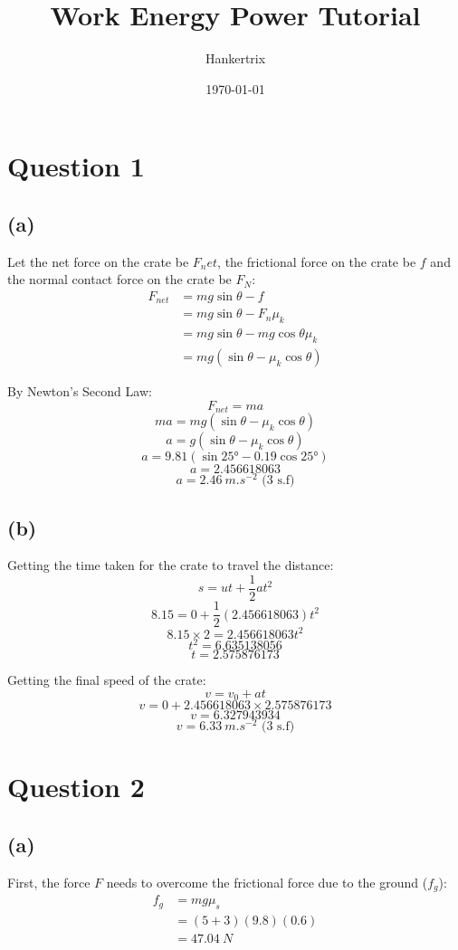 \documentclass[11pt]{article}
\author{Hankertrix}
\date{\today}
\title{Work Energy Power Tutorial}
\begin{document}
\maketitle
\setcounter{tocdepth}{2}
\tableofcontents


\section{Question 1}
\label{sec:org8bf0041}

\subsection{(a)}
\label{sec:orgd1a7f95}
Let the net force on the crate be \(F_net\), the frictional force on the crate be \(f\) and the normal contact force on the crate be \(F_N\):
\begin{align*}
F_{net} &= mg \sin \theta - f \\
&= mg \sin \theta - F_n \mu_k \\
&= mg \sin \theta - mg \cos \theta \mu_k \\
&= mg (\sin \theta - \mu_k \cos \theta)
\end{align*}

By Newton's Second Law:
\[F_{net} = ma\]
\[ma = mg (\sin \theta -\mu_k \cos \theta)\]
\[a = g (\sin \theta - \mu_k \cos \theta)\]
\[a = 9.81 (\sin 25 \unit{\degree} - 0.19 \cos 25 \unit{\degree})\]
\[a = 2.456618063\]
\[a = \SI{2.46}{\unit{m.s^{-2}}} \text{ (3 s.f)}\]

\subsection{(b)}
\label{sec:org5f5238a}
Getting the time taken for the crate to travel the distance:
\[s = ut + \frac{1}{2}at^2\]
\[8.15 = 0 + \frac{1}{2}(2.456618063)t^2\]
\[8.15 \times 2 = 2.456618063t^2\]
\[t^2 = 6.635138056\]
\[t = 2.575876173\]

Getting the final speed of the crate:
\[v = v_0 + at\]
\[v = 0 + 2.456618063 \times 2.575876173\]
\[v = 6.327943934\]
\[v = \SI{6.33}{\unit{m.s^{-2}}} \text{ (3 s.f)}\]


\section{Question 2}
\label{sec:org779d384}

\subsection{(a)}
\label{sec:orgdc86771}
First, the force \(F\) needs to overcome the frictional force due to the ground (\(f_g\)):
\begin{align*}
f_g &= mg \mu_s \\
&= (5 + 3)(9.8)(0.6) \\
&= \qty{47.04}{\unit{N}}
\end{align*}
\end{document}
